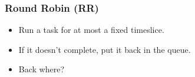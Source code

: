 \begin{frame}

\frametitle{Round Robin (RR)}

\begin{itemize}

\item Run a task for at most a fixed timeslice.

\item If it doesn't complete, put it back in the queue.

\item Back where?

\end{itemize}

\end{frame}
